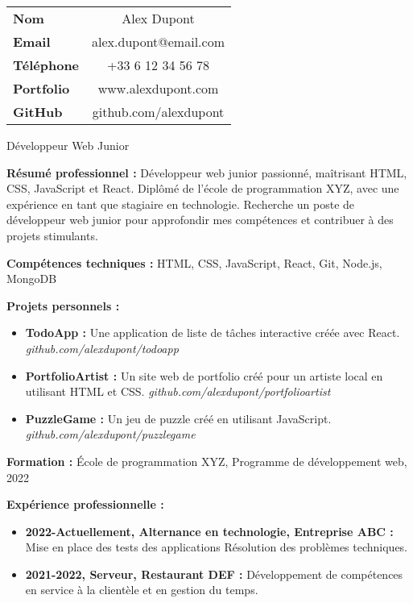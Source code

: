 \begin{framed}
    \addtolength{\leftskip}{5mm} %
    \addtolength{\rightskip}{5mm} %
    \addtolength{\topskip}{5mm} %

    \fontsize{9pt}{10pt}\selectfont
    \begin{tabular}{l c}
        \textbf{Nom}       & Alex Dupont           \\
        \textbf{Email}     & alex.dupont@email.com \\
        \textbf{Téléphone} & +33 6 12 34 56 78     \\
        \textbf{Portfolio} & www.alexdupont.com    \\
        \textbf{GitHub}    & github.com/alexdupont \\
    \end{tabular}

    \begin{center}
        \large   Développeur Web Junior
    \end{center}

    \textbf{Résumé professionnel :} Développeur web junior passionné, maîtrisant HTML, CSS, JavaScript et React. Diplômé de l'école de programmation XYZ, avec une expérience en tant que stagiaire en technologie. Recherche un poste de développeur web junior pour approfondir mes compétences et contribuer à des projets stimulants.

    \textbf{Compétences techniques :} HTML, CSS, JavaScript, React, Git, Node.js, MongoDB

    \textbf{Projets personnels :}
    \begin{itemize}
        \item \textbf{TodoApp :} Une application de liste de tâches interactive créée avec React. \textit{github.com/alexdupont/todoapp}
        \item \textbf{PortfolioArtist :} Un site web de portfolio créé pour un artiste local en utilisant HTML et CSS. \textit{github.com/alexdupont/portfolioartist}
        \item \textbf{PuzzleGame :} Un jeu de puzzle créé en utilisant JavaScript. \textit{github.com/alexdupont/puzzlegame}
    \end{itemize}
    \vspace{10pt}
    \textbf{Formation :} École de programmation XYZ, Programme de développement web, 2022

    \textbf{Expérience professionnelle :}
    \begin{itemize}
        \item \textbf{2022-Actuellement, Alternance en technologie, Entreprise ABC :}
              \subitem Mise en place des tests des applications
              \subitem Résolution des problèmes techniques.
        \item \textbf{2021-2022, Serveur, Restaurant DEF :}
              \subitem Développement de compétences en service à la clientèle et en gestion du temps.
    \end{itemize}
    \vspace{15pt}
\end{framed}


